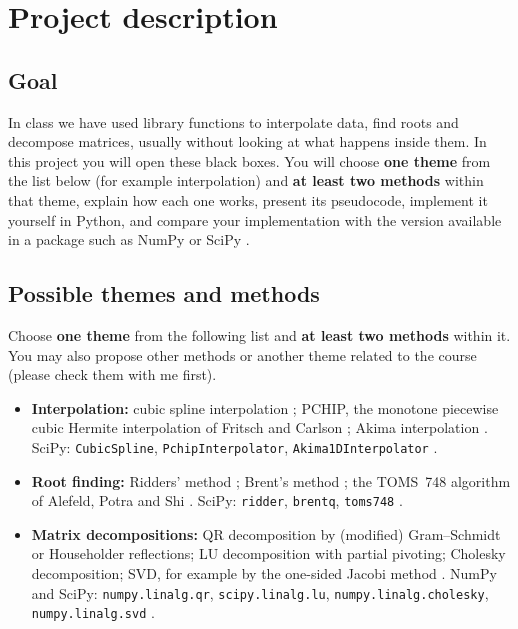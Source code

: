 \documentclass[11pt,a4paper]{article}
\begin{document}
\section*{Project description}

\subsection*{Goal}
In class we have used library functions to interpolate data, find roots and
decompose matrices, usually without looking at what happens inside them. In
this project you will open these black boxes. You will choose \textbf{one theme}
from the list below (for example interpolation) and \textbf{at least two
methods} within that theme, explain how each one works, present its pseudocode, implement it yourself in Python, and
compare your implementation with the version available in a package such as
NumPy or SciPy \cite{scipy}.

\subsection*{Possible themes and methods}
Choose \textbf{one theme} from the following list and \textbf{at least two
methods} within it. You may also propose other methods or another theme
related to the course (please check them with me first).
\begin{itemize}
  \item \textbf{Interpolation:} cubic spline interpolation \cite{deboor};
        PCHIP, the monotone piecewise cubic Hermite interpolation of Fritsch
        and Carlson \cite{fritsch}; Akima interpolation \cite{akima}. SciPy:
        \texttt{CubicSpline}, \texttt{PchipInterpolator},
        \texttt{Akima1DInterpolator} \cite{scipyinterp}.
  \item \textbf{Root finding:} Ridders' method \cite{ridders}; Brent's method
        \cite{brent}; the TOMS~748 algorithm of Alefeld, Potra and Shi
        \cite{toms748}. SciPy: \texttt{ridder}, \texttt{brentq},
        \texttt{toms748} \cite{scipyopt}.
  \item \textbf{Matrix decompositions:} QR decomposition by (modified)
        Gram--Schmidt or Householder reflections; LU decomposition with
        partial pivoting; Cholesky decomposition; SVD, for example by the
        one-sided Jacobi method \cite{trefethen,golub}. NumPy and SciPy:
        \texttt{numpy.linalg.qr}, \texttt{scipy.linalg.lu},
        \texttt{numpy.linalg.cholesky}, \texttt{numpy.linalg.svd}
        \cite{numpylinalg}.
\end{itemize}
\end{document}
